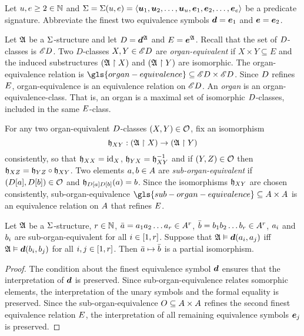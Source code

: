 
Let $u, e \geq 2 \in \mathbb{N}$ and
$\mathrm{\Sigma} = \mathrm{\Sigma}(u, e) = 
\left\langle \bm{u}_{1},\bm{u}_{2},\dots,\bm{u}_{u},\bm{e}_{1},\bm{e}_{2},\dots,\bm{e}_{e} \right\rangle$
be a predicate signature.
Abbreviate the finest two equivalence symbols $\bm{d} = \bm{e}_{1}$ and $\bm{e} = \bm{e}_{2}$.
\begin{definition}
Let $\mathfrak{A}$ be a $\mathrm{\Sigma}$-structure and let $D = \bm{d}^{\mathfrak{A}}$ and
$E = \bm{e}^{\mathfrak{A}}$.
Recall that the set of $D$-classes is ${\mathscr{E}D}$.
Two $D$-classes $X, Y \in {\mathscr{E}D}$ are \emph{organ-equivalent}
if $X \times Y \subseteq E$ and the induced substructures 
$(\mathfrak{A} \restriction X)$ and $(\mathfrak{A} \restriction Y)$ are isomorphic.
The organ-equivalence relation is
$\gls{organ-equivalence} \subseteq \domXX{\Ecl\relD}$.
Since $D$ refines $E$, organ-equivalence is an equivalence relation
on ${\mathscr{E}D}$.
An \emph{organ} is an organ-equivalence-class. That is, an organ
is a maximal set of isomorphic $D$-classes, included in the same
$E$-class.

For any two organ-equivalent $D$-classes $(X, Y) \in \mathcal{O}$,
fix an isomorphism
\[
  \mathfrak{h}_{XY} : (\mathfrak{A} \restriction X) \to (\mathfrak{A} \restriction Y)
\]
consistently, so that $\mathfrak{h}_{XX} = \operatorname{id}_{X}$,
$\mathfrak{h}_{YX} = \mathfrak{h}_{XY}^{-1}$
and if $(Y, Z) \in \mathcal{O}$ then
$\mathfrak{h}_{XZ} = \mathfrak{h}_{YZ} \circ \mathfrak{h}_{XY}$.
Two elements $a, b \in A$ are \emph{sub-organ-equivalent}
if $(D[a], D[b]) \in \mathcal{O}$ and
$\mathfrak{h}_{D[a]D[b]}(a) = b$.
Since the isomorphisms $\mathfrak{h}_{XY}$ are chosen consistently,
sub-organ-equivalence 
$\gls{sub-organ-equivalence} \subseteq \domAA$ is an equivalence relation on
$A$ that refines $E$.
\end{definition}

\begin{remark}\label{rem:monadic-same-organ-iso}
Let $\mathfrak{A}$ be a $\mathrm{\Sigma}$-structure, $r \in \mathbb{N}$,
$\bar{a} = a_{1}a_{2}\dots a_{r} \in A^r$,
$\bar{b} = b_{1}b_{2}\dots b_{r} \in A^r$,
$a_{i}$ and $b_{i}$ are sub-organ-equivalent for all $i \in [1,r]$.
Suppose that
$\mathfrak{A} \vDash \bm{d}(a_{i}, a_{j})$ iff $\mathfrak{A} \vDash \bm{d}(b_{i}, b_{j})$
for all $i, j \in [1,r]$.
Then $\bar{a} \mapsto \bar{b}$ is a partial isomorphism.
\end{remark}
\begin{proof}
The condition about the finest equivalence symbol $\bm{d}$ ensures that the
interpretation of $\bm{d}$ is preserved.
Since sub-organ-equivalence relates somorphic elements, the interpretation of
the unary symbols and the formal equality is preserved.
Since the sub-organ-equivalence $O \subseteq {A\times A}$ refines the
second finest equivalence relation $E$, the interpretation of all remaining
equivalence symbols $\bm{e}_{j}$ is preserved.
\end{proof}

